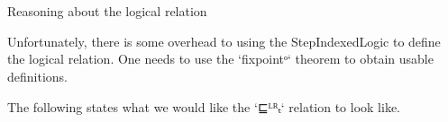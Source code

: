 \begin{code}
\AgdaSpace{}%
\AgdaSpace{}%
\AgdaSpace{}%
\AgdaSpace{}%
\<%
\\
\>[0]\AgdaSpace{}%
\AgdaSpace{}%
\AgdaSpace{}%
\AgdaSpace{}%
\AgdaSpace{}%
\AgdaSymbol{=}\AgdaSpace{}%
\AgdaSpace{}%
\<%
\\
\>[0]\AgdaSpace{}%
\AgdaSpace{}%
\AgdaSpace{}%
\AgdaSpace{}%
\AgdaSpace{}%
\AgdaSymbol{=}\AgdaSpace{}%
\AgdaSpace{}%
\<%
\end{code}

Reasoning about the logical relation

Unfortunately, there is some overhead to using the StepIndexedLogic to
define the logical relation. One needs to use the `fixpointᵒ` theorem
to obtain usable definitions.

The following states what we would like the `⊑ᴸᴿₜ` relation to look
like.

